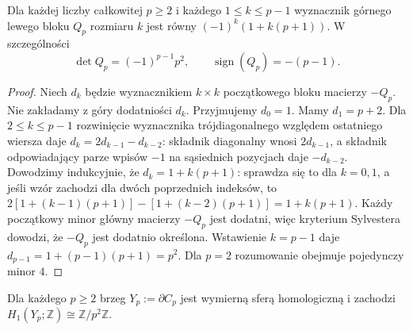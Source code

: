 \begin{center}
\end{center}

\begin{lemat}
\label{lem:tg-rb-minors}
Dla każdej liczby całkowitej $p\geq2$ i każdego
$1\leq k\leq p-1$ wyznacznik górnego lewego bloku
$Q_p$ rozmiaru $k$ jest równy
$(-1)^k(1+k(p+1))$. W szczególności
\[
\det Q_p=(-1)^{p-1}p^2,
\qquad \operatorname{sign}(Q_p)=-(p-1).
\]
\end{lemat}

\begin{proof}
Niech $d_k$ będzie wyznacznikiem $k\times k$
początkowego bloku macierzy $-Q_p$.
Nie zakładamy z góry dodatniości $d_k$.
Przyjmujemy $d_0=1$. Mamy $d_1=p+2$.
Dla $2\leq k\leq p-1$ rozwinięcie wyznacznika
trójdiagonalnego względem ostatniego wiersza daje
$d_k=2d_{k-1}-d_{k-2}$:
składnik diagonalny wnosi $2d_{k-1}$,
a składnik odpowiadający parze wpisów $-1$
na sąsiednich pozycjach daje $-d_{k-2}$.
Dowodzimy indukcyjnie,
że $d_k=1+k(p+1)$: sprawdza się to dla $k=0,1$,
a jeśli wzór zachodzi dla dwóch poprzednich indeksów,
to $2[1+(k-1)(p+1)]-[1+(k-2)(p+1)]
=1+k(p+1)$.
Każdy początkowy minor główny macierzy $-Q_p$
jest dodatni, więc kryterium Sylvestera dowodzi,
że $-Q_p$ jest dodatnio określona. Wstawienie
$k=p-1$ daje $d_{p-1}=1+(p-1)(p+1)=p^2$.
Dla $p=2$ rozumowanie obejmuje pojedynczy minor $4$.
\end{proof}

\begin{twierdzenie}
\label{thm:tg-rb-h1boundary}
Dla każdego $p\geq2$ brzeg $Y_p:=\partial C_p$
jest wymierną sferą homologiczną i zachodzi
$H_1(Y_p;\mathbb Z)\cong\mathbb Z/p^2\mathbb Z$.
\end{twierdzenie}

